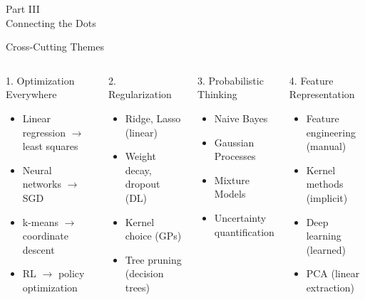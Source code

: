 \documentclass[aspectratio=169,11pt]{beamer}
\begin{document}
\begin{frame}{}
\begin{center}
{\Huge \textcolor{hec-blue}{Part III}}\\[1em]
{\LARGE Connecting the Dots}
\end{center}
\end{frame}

\begin{frame}{Cross-Cutting Themes}
\begin{columns}
\begin{block}{1. Optimization Everywhere}
\begin{itemize}
    \item Linear regression $\to$ least squares
    \item Neural networks $\to$ SGD
    \item k-means $\to$ coordinate descent
    \item RL $\to$ policy optimization
\end{itemize}
\end{block}

\begin{block}{2. Regularization}
\begin{itemize}
    \item Ridge, Lasso (linear)
    \item Weight decay, dropout (DL)
    \item Kernel choice (GPs)
    \item Tree pruning (decision trees)
\end{itemize}
\end{block}

\begin{block}{3. Probabilistic Thinking}
\begin{itemize}
    \item Naive Bayes
    \item Gaussian Processes
    \item Mixture Models
    \item Uncertainty quantification
\end{itemize}
\end{block}

\begin{block}{4. Feature Representation}
\begin{itemize}
    \item Feature engineering (manual)
    \item Kernel methods (implicit)
    \item Deep learning (learned)
    \item PCA (linear extraction)
\end{itemize}
\end{block}
\end{columns}
\end{frame}
\end{document}
